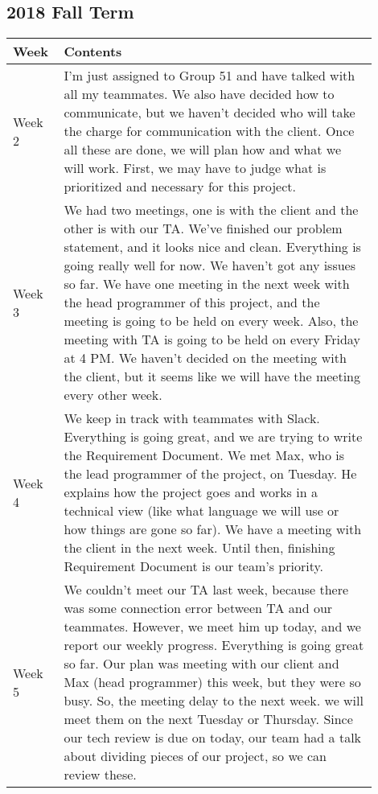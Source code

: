 \documentclass[10pt]{article}
\begin{document}
    \subsection{2018 Fall Term}
        \begin{center}
        \begin{tabular}{ | p{0.1\linewidth} | p{0.8\linewidth} | } \hline
            Week & Contents  \\ \hline  
            Week 2 &  I'm just assigned to Group 51 and have talked with all my teammates.
            We also have decided how to communicate, but we haven't decided who will take the charge for communication with the client.
            Once all these are done, we will plan how and what we will work.
            First, we may have to judge what is prioritized and necessary for this project. \\ \hline
            Week 3 &  We had two meetings, one is with the client and the other is with our TA.
            We've finished our problem statement, and it looks nice and clean.
            Everything is going really well for now.
            We haven't got any issues so far.
            We have one meeting in the next week with the head programmer of this project, and the meeting is going to be held on every week.
            Also, the meeting with TA is going to be held on every Friday at 4 PM.
            We haven't decided on the meeting with the client, but it seems like we will have the meeting every other week.  \\ \hline
            Week 4 &  We keep in track with teammates with Slack.
            Everything is going great, and we are trying to write the Requirement Document. 
            We met Max, who is the lead programmer of the project, on Tuesday. 
            He explains how the project goes and works in a technical view (like what language we will use or how things are gone so far). 
            We have a meeting with the client in the next week. Until then, finishing Requirement Document is our team's priority.\\ \hline 
            Week 5 & We couldn't meet our TA last week, because there was some connection error between TA and our teammates.
            However, we meet him up today, and we report our weekly progress.
            Everything is going great so far.
            Our plan was meeting with our client and Max (head programmer) this week, but they were so busy.
            So, the meeting delay to the next week. we will meet them on the next Tuesday or Thursday.
            Since our tech review is due on today, our team had a talk about dividing pieces of our project, so we can review these.

\end{tabular}
\end{center}
\end{document}
